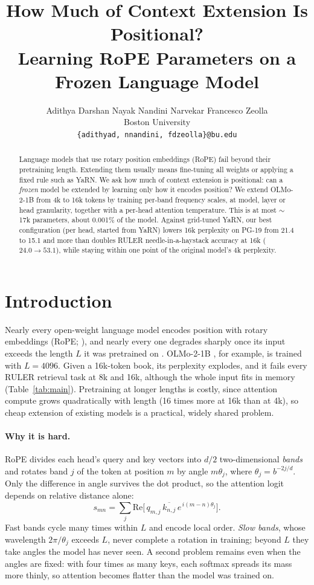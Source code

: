 \documentclass[11pt]{article}
\title{How Much of Context Extension Is Positional?\\Learning RoPE Parameters on a Frozen Language Model}
\author{Adithya Darshan Nayak \quad Nandini Narvekar \quad Francesco Zeolla \\
  Boston University \\
  \texttt{\{adithyad, nnandini, fdzeolla\}@bu.edu}}
\begin{document}
\maketitle

\begin{abstract}
Language models that use rotary position embeddings (RoPE) fail beyond their pretraining length. Extending them usually means fine-tuning all weights or applying a fixed rule such as YaRN. We ask how much of context extension is positional: can a \emph{frozen} model be extended by learning only how it encodes position? We extend OLMo-2-1B from 4k to 16k tokens by training per-band frequency scales, at model, layer or head granularity, together with a per-head attention temperature. This is at most ${\sim}$17k parameters, about 0.001\% of the model. Against grid-tuned YaRN, our best configuration (per head, started from YaRN) lowers 16k perplexity on PG-19 from 21.4 to 15.1 and more than doubles RULER needle-in-a-haystack accuracy at 16k ($24.0 \rightarrow 53.1$), while staying within one point of the original model's 4k perplexity.
\end{abstract}

\section{Introduction}

Nearly every open-weight language model encodes position with rotary embeddings (RoPE; \citealp{su2021roformer}), and nearly every one degrades sharply once its input exceeds the length $L$ it was pretrained on \citep{chen2023pi, peng2024yarn}. OLMo-2-1B \citep{olmo2024olmo2}, for example, is trained with $L = 4096$. Given a 16k-token book, its perplexity explodes, and it fails every RULER retrieval task \citep{hsieh2024ruler} at 8k and 16k, although the whole input fits in memory (Table~\ref{tab:main}). Pretraining at longer lengths is costly, since attention compute grows quadratically with length (16 times more at 16k than at 4k), so cheap extension of existing models is a practical, widely shared problem.

\paragraph{Why it is hard.}
RoPE divides each head's query and key vectors into $d/2$ two-dimensional \emph{bands} and rotates band $j$ of the token at position $m$ by angle $m\theta_j$, where $\theta_j = b^{-2j/d}$. Only the difference in angle survives the dot product, so the attention logit depends on relative distance alone:
\begin{equation}
s_{mn} = \textstyle\sum_{j} \mathrm{Re}\big[\,q_{m,j}\,\overline{k_{n,j}}\,e^{\,i(m-n)\theta_j}\big].
\end{equation} Fast bands cycle many times within $L$ and encode local order. \emph{Slow bands}, whose wavelength $2\pi/\theta_j$ exceeds $L$, never complete a rotation in training; beyond $L$ they take angles the model has never seen. A second problem remains even when the angles are fixed: with four times as many keys, each softmax spreads its mass more thinly, so attention becomes flatter than the model was trained on.
\end{document}
